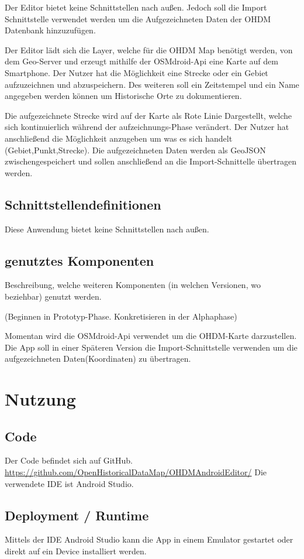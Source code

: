 Der Editor bietet keine Schnittstellen nach außen. Jedoch soll die Import Schnittstelle verwendet werden um die Aufgezeichneten Daten der OHDM Datenbank hinzuzufügen.

Der Editor lädt sich die Layer, welche für die OHDM Map benötigt werden, von dem Geo-Server und erzeugt mithilfe der OSMdroid-Api eine Karte auf dem Smartphone. Der Nutzer hat die Möglichkeit eine Strecke oder ein Gebiet aufzuzeichnen und abzuspeichern. Des weiteren soll ein Zeitstempel und ein Name angegeben werden können um Historische Orte zu dokumentieren.

Die aufgezeichnete Strecke wird auf der Karte als Rote Linie Dargestellt, welche sich kontinuierlich während der aufzeichnungs-Phase verändert. Der Nutzer hat anschließend die Möglichkeit anzugeben um was es sich handelt (Gebiet,Punkt,Strecke). Die aufgezeichneten Daten werden als GeoJSON zwischengespeichert und sollen anschließend an die Import-Schnittelle übertragen werden.

\subsection{Schnittstellendefinitionen}

Diese Anwendung bietet keine Schnittstellen nach außen.

\subsection{genutztes Komponenten}
Beschreibung, welche weiteren Komponenten (in welchen Versionen, wo beziehbar) genutzt werden.

(Beginnen in Prototyp-Phase. Konkretisieren in der Alphaphase)

Momentan wird die OSMdroid-Api verwendet um die OHDM-Karte darzustellen.
Die App soll in einer Späteren Version die Import-Schnittstelle verwenden um die aufgezeichneten Daten(Koordinaten) zu übertragen.

\section{Nutzung}
\subsection{Code}
Der Code befindet sich auf GitHub. \url{https://github.com/OpenHistoricalDataMap/OHDMAndroidEditor/}
Die verwendete IDE ist Android Studio.

\subsection{Deployment / Runtime}
Mittels der IDE Android Studio kann die App in einem Emulator gestartet oder direkt auf ein Device installiert werden.

